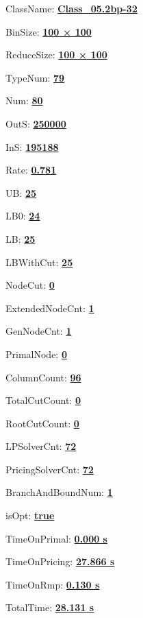 \documentclass[11pt]{article}
\begin{document}
\pagestyle{empty}


ClassName: \underline{\textbf{Class_05.2bp-32}}
\par
BinSize: \underline{\textbf{100 × 100}}
\par
ReduceSize: \underline{\textbf{100 × 100}}
\par
TypeNum: \underline{\textbf{79}}
\par
Num: \underline{\textbf{80}}
\par
OutS: \underline{\textbf{250000}}
\par
InS: \underline{\textbf{195188}}
\par
Rate: \underline{\textbf{0.781}}
\par
UB: \underline{\textbf{25}}
\par
LB0: \underline{\textbf{24}}
\par
LB: \underline{\textbf{25}}
\par
LBWithCut: \underline{\textbf{25}}
\par
NodeCut: \underline{\textbf{0}}
\par
ExtendedNodeCnt: \underline{\textbf{1}}
\par
GenNodeCnt: \underline{\textbf{1}}
\par
PrimalNode: \underline{\textbf{0}}
\par
ColumnCount: \underline{\textbf{96}}
\par
TotalCutCount: \underline{\textbf{0}}
\par
RootCutCount: \underline{\textbf{0}}
\par
LPSolverCnt: \underline{\textbf{72}}
\par
PricingSolverCnt: \underline{\textbf{72}}
\par
BranchAndBoundNum: \underline{\textbf{1}}
\par
isOpt: \underline{\textbf{true}}
\par
TimeOnPrimal: \underline{\textbf{0.000 s}}
\par
TimeOnPricing: \underline{\textbf{27.866 s}}
\par
TimeOnRmp: \underline{\textbf{0.130 s}}
\par
TotalTime: \underline{\textbf{28.131 s}}
\par
\newpage


\end{document}
